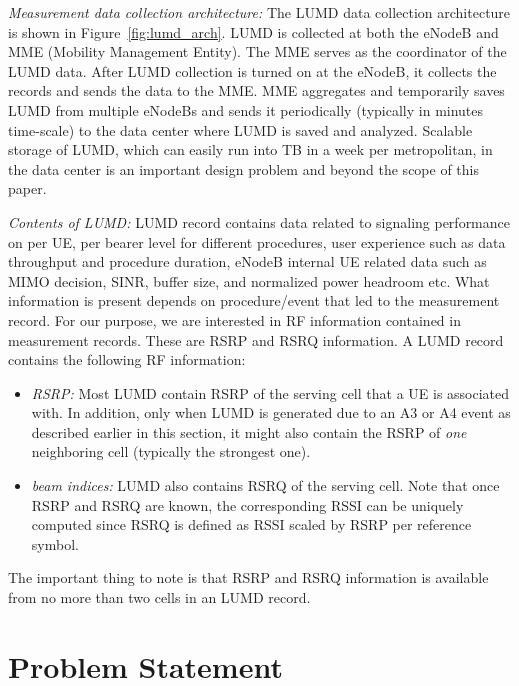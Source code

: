 \documentclass[conference, 10pt]{IEEEtran}
\begin{document}
{\em Measurement data collection architecture:} The LUMD data collection architecture
is shown in Figure~\ref{fig:lumd_arch}. LUMD is collected at both the eNodeB and MME
(Mobility Management Entity). The MME serves as the coordinator of the LUMD data.
After LUMD collection is turned on at the eNodeB, it collects the records and sends
the data to the MME. MME aggregates and temporarily saves LUMD from multiple
eNodeBs and sends it periodically (typically in minutes time-scale) to the data
center where LUMD is saved and analyzed. Scalable storage of LUMD, which can easily
run into TB in a week per metropolitan, in the data center is an important design
problem and beyond the scope of this paper.


{\em Contents of LUMD:} LUMD record contains data related to signaling performance on
per UE, per bearer level for different procedures, user experience such as data
throughput and procedure duration, eNodeB internal UE related data such as MIMO
decision, SINR, buffer size, and normalized power headroom etc.  What information is
present depends on procedure/event that led to the measurement record. For our
purpose, we are interested in RF information contained in measurement records. These
are RSRP and RSRQ information. A LUMD record contains the following RF information:

\begin{itemize}

\item {\em RSRP:} Most LUMD contain RSRP of the serving cell that a UE is associated
with. In addition, only when LUMD is generated due to an A3 or A4 event as described
earlier in this section, it might also contain the RSRP of {\em one} neighboring
cell (typically the strongest one).

\item {\em beam indices:} LUMD also contains RSRQ of the serving cell. Note that once RSRP
and RSRQ are known, the corresponding RSSI can be uniquely computed since RSRQ is
defined as RSSI scaled by RSRP per reference symbol.

\end{itemize}

The important thing to note is that RSRP and RSRQ information is available from no
more than two cells in an LUMD record.





\section{Problem Statement} 
\label{sec:ps}
\end{document}
